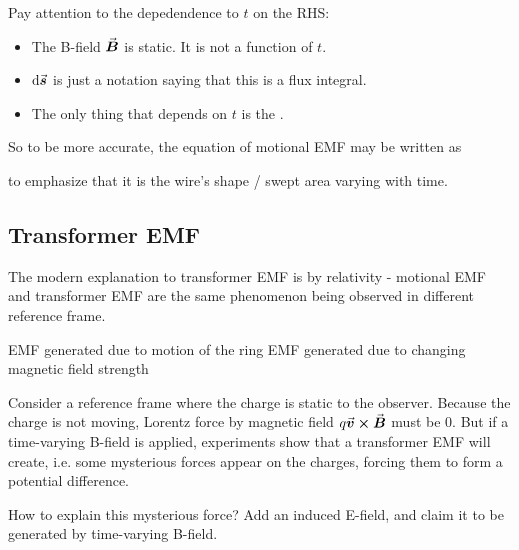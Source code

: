 \documentclass[class=article, crop=false, 12pt]{standalone}
\begin{document}
Pay attention to the depedendence to $t$ on the RHS:
\begin{itemize}
    \item The B-field $\va*{B}$ is static. It is not a function of $t$.
    
    \item $\dd{\va*{s}}$ is just a notation saying that this is a flux integral. 

    \item The only thing that depends on $t$ is the .
\end{itemize}

So to be more accurate, the equation of motional EMF may be written as 

to emphasize that it is the wire's shape / swept area varying with time.



\subsection{Transformer EMF}

The modern explanation to transformer EMF is by relativity - 
motional EMF and transformer EMF are the same phenomenon being observed in different reference frame. 


EMF generated due to motion of the ring
EMF generated due to changing magnetic field strength

Consider a reference frame where the charge is static to the observer. 
Because the charge is not moving, 
Lorentz force by magnetic field $q\va*{v}\cross\va*{B}$ must be $0$.
But if a time-varying B-field is applied, 
experiments show that a transformer EMF will create, 
i.e. some mysterious forces appear on the charges, 
forcing them to form a potential difference.

How to explain this mysterious force? 
Add an induced E-field, and claim it to be generated by time-varying B-field.

\end{document}
